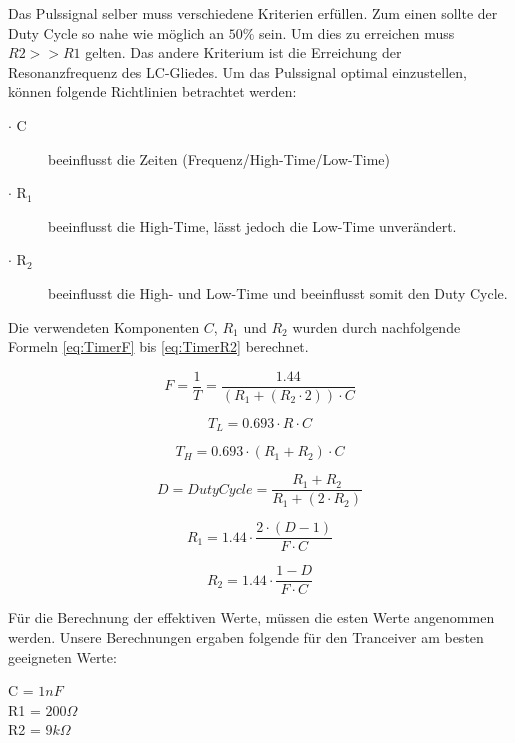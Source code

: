 Das Pulssignal selber muss verschiedene Kriterien erfüllen. Zum einen sollte der Duty Cycle so nahe wie möglich an $50\%$ sein. Um dies zu erreichen muss $R2 >> R1$ gelten. Das andere Kriterium ist die Erreichung der Resonanzfrequenz des LC-Gliedes. Um das Pulssignal optimal einzustellen, können folgende Richtlinien betrachtet werden:
\begin{description}
	\item [$\cdot$ C] beeinflusst die Zeiten (Frequenz/High-Time/Low-Time)
	\item [$\cdot$ R$_{1}$] beeinflusst die High-Time, lässt jedoch die Low-Time unverändert.
	\item [$\cdot$ R$_{2}$ ] beeinflusst die High- und Low-Time und beeinflusst somit den Duty Cycle.
\end{description}

Die verwendeten Komponenten $C$, $R_{1}$ und $R_{2}$ wurden durch nachfolgende Formeln \ref{eq:TimerF} bis \ref{eq:TimerR2} berechnet. 

\begin{equation}\label{eq:TimerF}
F=\dfrac{1}{T}=\frac{1.44}{(R_{1}+(R_{2}\cdot 2))\cdot C}
\end{equation} 

\begin{equation}\label{eq:TimerTL}
T_{L}= 0.693\cdot R\cdot C
\end{equation}

\begin{equation}\label{eq:TimerTH}
T_{H}= 0.693\cdot (R_{1}+R_{2})\cdot C
\end{equation}

\begin{equation}\label{eq:TimerD}
D= Duty Cycle= \dfrac{R_{1}+R_{2}}{R_{1}+(2\cdot R_{2})}
\end{equation}

\begin{equation}\label{eq:TimerR1}
R_{1}= 1.44\cdot \frac{2\cdot (D-1)}{F\cdot C}
\end{equation}

\begin{equation}\label{eq:TimerR2}
R_{2}= 1.44\cdot \dfrac{1-D}{F\cdot C}
\end{equation}

Für die Berechnung der effektiven Werte, müssen die esten Werte angenommen werden. Unsere Berechnungen ergaben folgende für den Tranceiver am besten geeigneten Werte:

\begin{center}
C = $1nF$\\
R1 = $200\Omega$\\
R2 = $9k\Omega$\\
\end{center}
 

